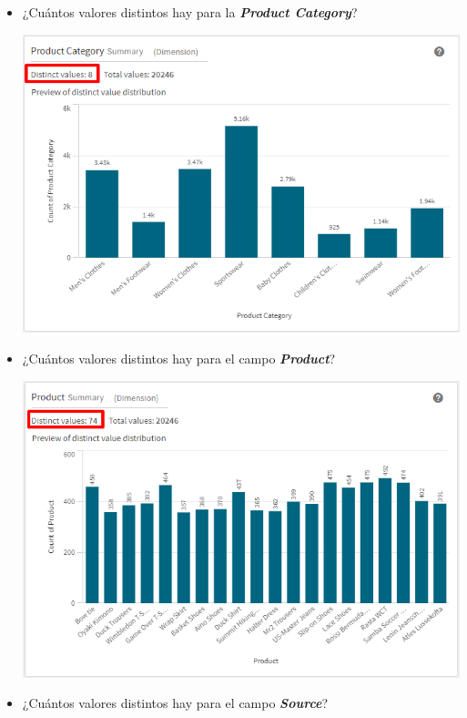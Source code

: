 \documentclass[12pt,letterpaper]{article}
\newcommand\tab[1][1cm]{\hspace*{#1}}
\begin{document}
\begin{enumerate}[\tab 1.]
\begin{itemize}
\begin{center}
            \end{center}
            \item ¿Cuántos valores distintos hay para la \textit{\textbf{Product Category}}?
            \begin{center}
                \includegraphics[width=13cm]{./img/img6.2.png}
            \end{center}
            \item ¿Cuántos valores distintos hay para el campo \textit{\textbf{Product}}?
            \begin{center}
                \includegraphics[width=13cm]{./img/img6.3.png}
            \end{center}
            \item ¿Cuántos valores distintos hay para el campo \textit{\textbf{Source}}?
            \begin{center}

\end{center}
\end{itemize}
\end{enumerate}
\end{document}
